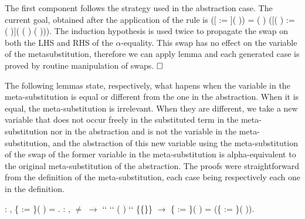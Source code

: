 \begin{coqdoccode}
\end{coqdoccode}
The first component follows the strategy used in the abstraction case. The current goal, obtained after the application of the rule  is    ([ := ](   )) =
    (   ) ([(   ) := (   )]( (   )  (   ))). The induction hypothesis is used twice to propagate the swap on both the LHS and RHS of the $\alpha$-equality. This swap has no effect on the variable of the metasubstitution, therefore we can apply lemma  and each generated case is proved by routine manipulation of swaps. $\hfill\Box$
\begin{coqdoccode}
\coqdocemptyline
\coqdocemptyline
\end{coqdoccode}
The following lemmas state, respectively, what hapens when the variable in the meta-substitution is equal or different from the one in the abstraction. When it is equal, the meta-substitution is irrelevant. When they are different, we take a new variable that does not occur freely in the substituted term in the meta-substitution nor in the abstraction and is not the variable in the meta-substitution, and the abstraction of this new variable using the meta-substitution of the swap of the former variable in the meta-substitution is alpha-equivalent to the original meta-substitution of the abstraction. The proofs were straightforward from the definition of the meta-substitution, each case being respectively each one in the definition. \newline
\begin{coqdoccode}
\coqdocnoindent
{}  : \coqdockw{\ensuremath{\forall}}   , \{ := \}(  ) =   .\coqdoceol
\coqdocemptyline
\coqdocnoindent
{}  : \coqdockw{\ensuremath{\forall}}     ,  \ensuremath{\not=}  \ensuremath{\rightarrow}  ``   ``  (  ) `` \{\{\}\} \ensuremath{\rightarrow} \{ := \}(  ) =   (\{ := \}(   )).\coqdoceol
\coqdocemptyline
\coqdocemptyline
\end{coqdoccode}
